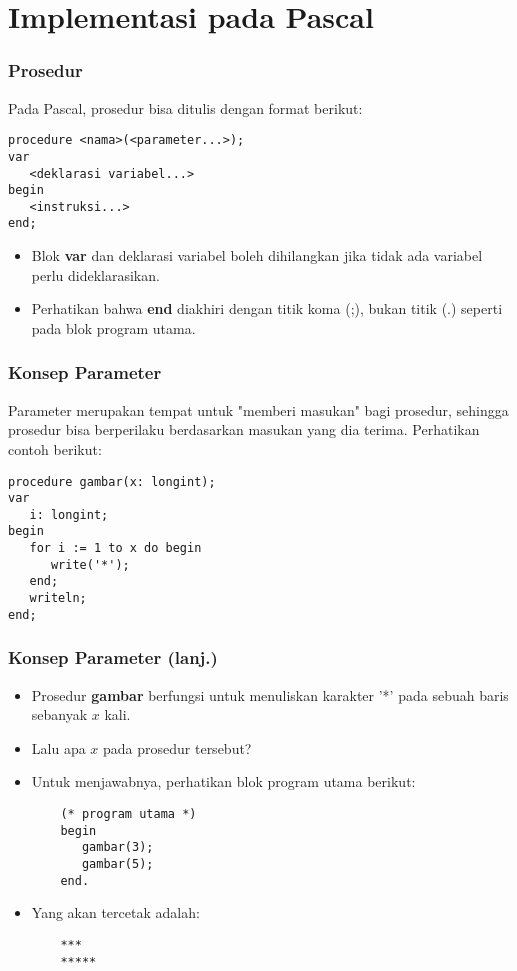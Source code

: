 \documentclass{beamer}
\begin{document}
\section{Implementasi pada Pascal}
\frame{\sectionpage}

\begin{frame}[fragile]
\frametitle{Prosedur}
Pada Pascal, prosedur bisa ditulis dengan format berikut:
\begin{lstlisting}
procedure <nama>(<parameter...>);
var
   <deklarasi variabel...>
begin
   <instruksi...>
end;
\end{lstlisting}
\begin{itemize}
	\item Blok \textbf{var} dan deklarasi variabel boleh dihilangkan jika tidak ada variabel perlu dideklarasikan.
	\item Perhatikan bahwa \textbf{end} diakhiri dengan titik koma (;), bukan titik (.) seperti pada blok program utama.
\end{itemize}
\end{frame}

\begin{frame}[fragile]
\frametitle{Konsep Parameter}
Parameter merupakan tempat untuk "memberi masukan" bagi prosedur, sehingga prosedur bisa berperilaku berdasarkan masukan yang dia terima.
\vfill
Perhatikan contoh berikut:
\begin{lstlisting}
procedure gambar(x: longint);
var
   i: longint;
begin
   for i := 1 to x do begin
      write('*');
   end;
   writeln;
end;
\end{lstlisting}
\end{frame}

\begin{frame}[fragile]
\frametitle{Konsep Parameter (lanj.)}
\begin{itemize}
	\item Prosedur \textbf{gambar} berfungsi untuk menuliskan karakter '*' pada sebuah baris sebanyak $x$ kali.
	\item Lalu apa $x$ pada prosedur tersebut?
	\item Untuk menjawabnya, perhatikan blok program utama berikut:
	\begin{lstlisting}
	(* program utama *)
	begin
	   gambar(3);
	   gambar(5);
	end.
	\end{lstlisting}
	\item Yang akan tercetak adalah:
	\begin{lstlisting}
	***
	*****
	\end{lstlisting}
\end{itemize}
\end{frame}
\end{document}
